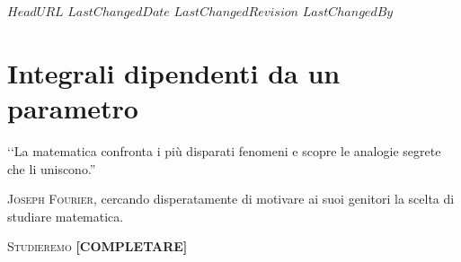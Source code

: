 \svnidlong
{$HeadURL$}
{$LastChangedDate$}
{$LastChangedRevision$}
{$LastChangedBy$}

\chapter{Integrali dipendenti da un parametro}

\begin{introduction}
	‘‘La matematica confronta i più disparati fenomeni e scopre le analogie segrete che li uniscono.''
	\begin{flushright}
		\textsc{Joseph Fourier,} cercando disperatamente di motivare ai suoi genitori la scelta di studiare matematica.
	\end{flushright}
\end{introduction}
\lettrine[findent=1pt, nindent=0pt]{S}{tudieremo} \textbf{[COMPLETARE]}
